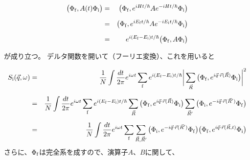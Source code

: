 \documentclass[a4j]{jsarticle}
\begin{document}
\begin{eqnarray}
	\big( \Phi_{\rm f} , A(t) \Phi_{\rm i} \big)
	&=&
	\big( \Phi_{\rm f} , e^{i H t/ \hbar} A e^{-i H t/ \hbar} \Phi_{\rm i} \big)
	\nonumber \\[2mm] &=&
	\big( \Phi_{\rm f} , e^{i E_{\rm f} t/ \hbar} A e^{-i E_{\rm i} t/ \hbar} \Phi_{\rm i} \big)
	\nonumber \\[2mm] &=&
	e^{i ( E_{\rm f} - E_{\rm i} ) t/ \hbar} \big( \Phi_{\rm f} , A \Phi_{\rm i} \big)
\end{eqnarray}

が成り立つ。
デルタ関数を開いて（フーリエ変換）、これを用いると


\begin{eqnarray}
	S_{\rm i}(\vec{q},\omega)
	&=&
	\dfrac{1}{N}
	\int \dfrac{ dt }{ 2 \pi }
	e^{ i \omega t }
	\sum_{\rm f}
	e^{ i ( E_{\rm f} - E_{\rm i} ) t / \hbar}
	\bigg|
	\sum_{\vec{R}}
	\big( \Phi_{\rm f} , e^{i \vec{q} \cdot \vec{r}(\vec{R})} \Phi_{\rm i} \big)
	\bigg|^{2}
	\nonumber \\[2mm] &=&
	\dfrac{1}{N}
	\int \dfrac{ dt }{ 2 \pi }
	e^{ i \omega t }
	\sum_{\rm f}
	e^{ i ( E_{\rm f} - E_{\rm i} ) t / \hbar}
	\sum_{\vec{R}}
	\big( \Phi_{\rm f} , e^{i \vec{q} \cdot \vec{r}(\vec{R})} \Phi_{\rm i} \big)
	\sum_{\vec{R}'}
	\big( \Phi_{\rm i} , e^{ - i \vec{q} \cdot \vec{r}(\vec{R}')} \Phi_{\rm f} \big)
	\nonumber \\[2mm] &=&
	\dfrac{1}{N}
	\int \dfrac{ dt }{ 2 \pi }
	e^{ i \omega t }
	\sum_{\rm f}
	\sum_{\vec{R},\vec{R}'}
	\big( \Phi_{\rm i} , e^{ - i \vec{q} \cdot \vec{r}(\vec{R}')} \Phi_{\rm f} \big)
	\big( \Phi_{\rm f} , e^{i \vec{q} \cdot \vec{r}(\vec{R},t)} \Phi_{\rm i} \big)
\end{eqnarray}
さらに、$\Phi_{\rm f}$は完全系を成すので、演算子$A$、$B$に関して、
\end{document}
